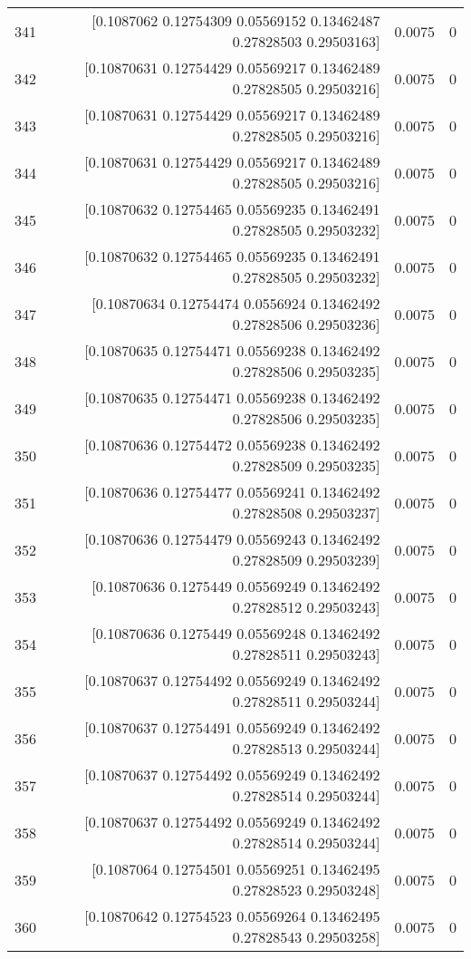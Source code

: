 \begin{longtable}{lrrr}
341 & [0.1087062  0.12754309 0.05569152 0.13462487 0.27828503 0.29503163] & 0.0075 & 0 \\
342 & [0.10870631 0.12754429 0.05569217 0.13462489 0.27828505 0.29503216] & 0.0075 & 0 \\
343 & [0.10870631 0.12754429 0.05569217 0.13462489 0.27828505 0.29503216] & 0.0075 & 0 \\
344 & [0.10870631 0.12754429 0.05569217 0.13462489 0.27828505 0.29503216] & 0.0075 & 0 \\
345 & [0.10870632 0.12754465 0.05569235 0.13462491 0.27828505 0.29503232] & 0.0075 & 0 \\
346 & [0.10870632 0.12754465 0.05569235 0.13462491 0.27828505 0.29503232] & 0.0075 & 0 \\
347 & [0.10870634 0.12754474 0.0556924  0.13462492 0.27828506 0.29503236] & 0.0075 & 0 \\
348 & [0.10870635 0.12754471 0.05569238 0.13462492 0.27828506 0.29503235] & 0.0075 & 0 \\
349 & [0.10870635 0.12754471 0.05569238 0.13462492 0.27828506 0.29503235] & 0.0075 & 0 \\
350 & [0.10870636 0.12754472 0.05569238 0.13462492 0.27828509 0.29503235] & 0.0075 & 0 \\
351 & [0.10870636 0.12754477 0.05569241 0.13462492 0.27828508 0.29503237] & 0.0075 & 0 \\
352 & [0.10870636 0.12754479 0.05569243 0.13462492 0.27828509 0.29503239] & 0.0075 & 0 \\
353 & [0.10870636 0.1275449  0.05569249 0.13462492 0.27828512 0.29503243] & 0.0075 & 0 \\
354 & [0.10870636 0.1275449  0.05569248 0.13462492 0.27828511 0.29503243] & 0.0075 & 0 \\
355 & [0.10870637 0.12754492 0.05569249 0.13462492 0.27828511 0.29503244] & 0.0075 & 0 \\
356 & [0.10870637 0.12754491 0.05569249 0.13462492 0.27828513 0.29503244] & 0.0075 & 0 \\
357 & [0.10870637 0.12754492 0.05569249 0.13462492 0.27828514 0.29503244] & 0.0075 & 0 \\
358 & [0.10870637 0.12754492 0.05569249 0.13462492 0.27828514 0.29503244] & 0.0075 & 0 \\
359 & [0.1087064  0.12754501 0.05569251 0.13462495 0.27828523 0.29503248] & 0.0075 & 0 \\
360 & [0.10870642 0.12754523 0.05569264 0.13462495 0.27828543 0.29503258] & 0.0075 & 0 \\

\end{longtable}
